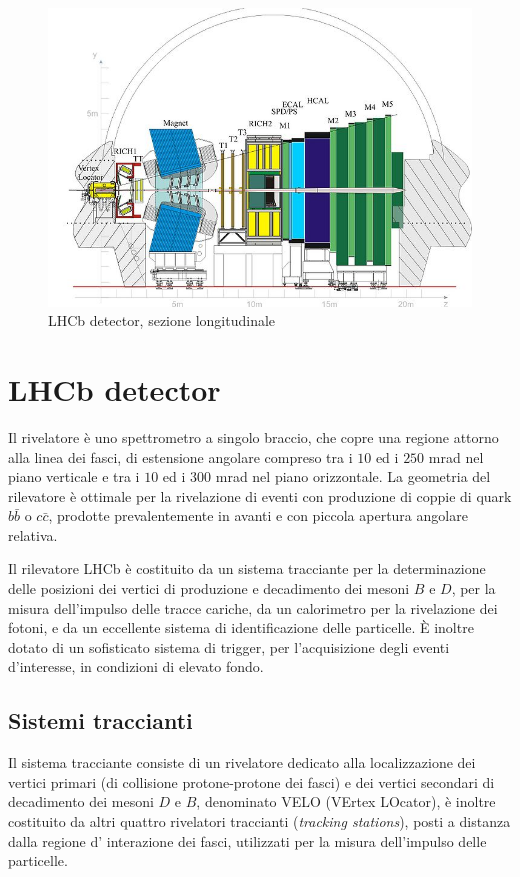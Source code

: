 \begin{figure}
\includegraphics[scale=1]{Immagini/lhcbrivelatore}
\caption{LHCb detector, sezione longitudinale}
\label{fig:detector}
\end{figure}

\section{LHCb detector}
\noindent
Il rivelatore \`e uno spettrometro a singolo braccio, che copre una regione attorno alla linea dei fasci, di estensione angolare compreso tra i $10$ ed i $250$ mrad nel piano verticale e tra i $10$ ed i $300$ mrad nel piano orizzontale. La geometria del rilevatore \`e ottimale per la rivelazione di eventi con produzione di coppie di quark $b\bar{b}$ o $c\bar{c}$, prodotte prevalentemente in avanti e con piccola apertura angolare relativa.

Il rilevatore LHCb \`e costituito da un sistema tracciante per la determinazione delle posizioni dei vertici di produzione e decadimento dei mesoni $B$ e $D$,
per la misura dell'impulso delle tracce cariche, da un calorimetro per la rivelazione dei fotoni, e da un eccellente sistema di identificazione delle particelle. \`E inoltre dotato di un sofisticato sistema di trigger, per l'acquisizione degli eventi d'interesse, in condizioni di elevato fondo. 

\subsection{Sistemi traccianti}
\noindent
Il sistema tracciante consiste di un rivelatore dedicato alla localizzazione dei vertici primari (di collisione protone-protone dei fasci) e dei vertici secondari di decadimento dei mesoni $D$ e $B$, denominato VELO (VErtex LOcator), \`e inoltre costituito da altri quattro rivelatori traccianti (\emph{tracking stations}), posti a distanza dalla regione d' interazione dei fasci, utilizzati per la misura dell'impulso delle particelle.

